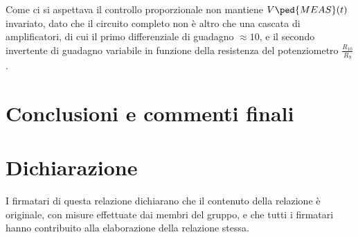 \documentclass[10pt, a4paper, italian]{article}
\begin{document}
Come ci si aspettava il controllo proporzionale non mantiene $V\ped{MEAS} (t)$
invariato, dato che il circuito completo non è altro che una cascata di
amplificatori, di cui il primo differenziale di guadagno $\approx 10$, e
il secondo invertente di guadagno variabile in funzione della resistenza del
potenziometro $\frac{R_{10}}{R_9}$.
\section*{Conclusioni e commenti finali}

\section*{Dichiarazione}
I firmatari di questa relazione dichiarano che il contenuto della relazione \`e
originale, con misure effettuate dai membri del gruppo, e che tutti i firmatari
hanno contribuito alla elaborazione della relazione stessa.
\end{document}

